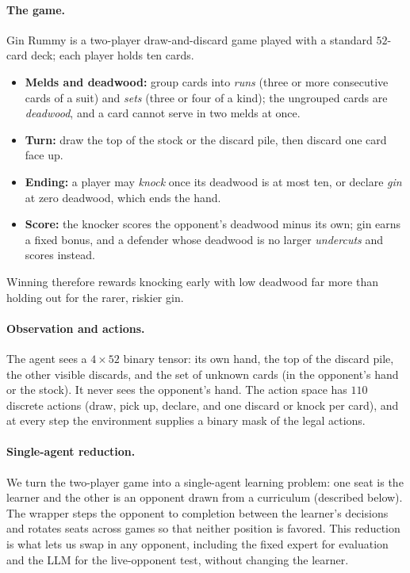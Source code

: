 \documentclass[letterpaper]{article} %
\begin{document}
\paragraph{The game.}
Gin Rummy is a two-player draw-and-discard game played with a standard $52$-card
deck; each player holds ten cards.
\begin{itemize}
\setlength\itemsep{0pt}
\item \textbf{Melds and deadwood:} group cards into \emph{runs} (three or more
consecutive cards of a suit) and \emph{sets} (three or four of a kind); the
ungrouped cards are \emph{deadwood}, and a card cannot serve in two melds at once.
\item \textbf{Turn:} draw the top of the stock or the discard pile, then discard
one card face up.
\item \textbf{Ending:} a player may \emph{knock} once its deadwood is at most ten,
or declare \emph{gin} at zero deadwood, which ends the hand.
\item \textbf{Score:} the knocker scores the opponent's deadwood minus its own;
gin earns a fixed bonus, and a defender whose deadwood is no larger
\emph{undercuts} and scores instead.
\end{itemize}
Winning therefore rewards knocking early with low deadwood far more than holding
out for the rarer, riskier gin.

\paragraph{Observation and actions.}
The agent sees a $4\times52$ binary tensor: its own hand, the top of the discard
pile, the other visible discards, and the set of unknown cards (in the
opponent's hand or the stock). It never sees the opponent's hand. The action
space has $110$ discrete actions (draw, pick up, declare, and one discard or
knock per card), and at every step the environment supplies a binary mask of the
legal actions.

\paragraph{Single-agent reduction.}
We turn the two-player game into a single-agent learning problem: one seat is the
learner and the other is an opponent drawn from a curriculum (described below).
The wrapper steps the opponent to completion between the learner's decisions and
rotates seats across games so that neither position is favored. This reduction is
what lets us swap in any opponent, including the fixed expert for evaluation and
the LLM for the live-opponent test, without changing the learner.
\end{document}
